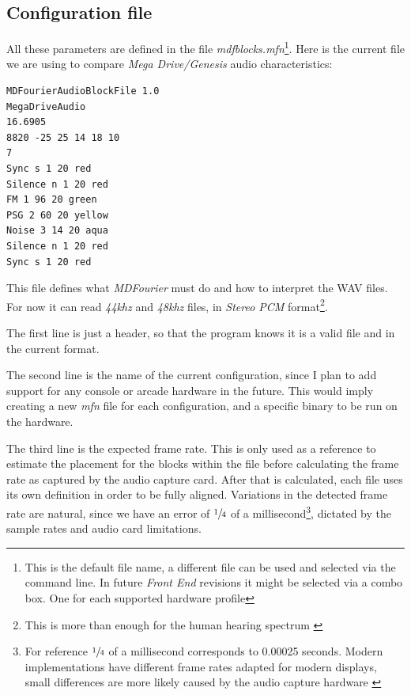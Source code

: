 \documentclass[10pt,a4paper]{report}
\begin{document}
\begin{appendices}
	
\chapter{Configuration file}
\label{mfnconfig}

All these parameters are defined in the file \textit{mdfblocks.mfn}\footnote{This is the default file name, a different file can be used and selected via the command line. In future \textit{Front End} revisions it might be selected via a combo box. One for each supported hardware profile}. Here is the current file we are using to compare \textit{Mega Drive/Genesis} audio characteristics:

\begin{verbatim}
MDFourierAudioBlockFile 1.0
MegaDriveAudio
16.6905
8820 -25 25 14 18 10
7
Sync s 1 20 red
Silence n 1 20 red
FM 1 96 20 green
PSG 2 60 20 yellow
Noise 3 14 20 aqua
Silence n 1 20 red
Sync s 1 20 red
\end{verbatim}

This file defines what \textit{MDFourier} must do and how to interpret the WAV files. For now it can read \textit{44khz} and \textit{48khz} files, in \textit{Stereo PCM} format\footnote{This is more than enough for the human hearing spectrum \cite{MontyMontgomery}}.

The first line is just a header, so that the program knows it is a valid file and in the current format.

The second line is the name of the current configuration, since I plan to add support for any console or arcade hardware in the future. This would imply creating a new \textit{mfn} file for each configuration, and a specific binary to be run on the hardware.

The third line is the expected frame rate. This is only used as a reference to estimate the placement for the blocks within the file before calculating the frame rate as captured by the audio capture card. After that is calculated, each file uses its own definition in order to be fully aligned. Variations in the detected frame rate are natural, since we have an error of $\sfrac{1}{4}$ of a millisecond\footnote{For reference $\sfrac{1}{4}$ of a millisecond corresponds to 0.00025 seconds. Modern implementations have different frame rates adapted for modern displays, small differences are more likely caused by the audio capture hardware \cite{SoundCardClock}}, dictated by the sample rates and audio card limitations.


\end{appendices}
\end{document}

